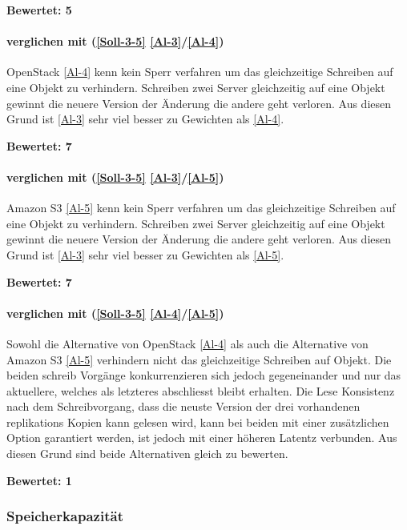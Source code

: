 \textbf{Bewertet: 5}


\paragraph*{  verglichen mit  (\ref{Soll-3-5} \ref{Al-3}/\ref{Al-4})}
OpenStack \ref{Al-4} kenn kein Sperr verfahren um das gleichzeitige Schreiben auf eine Objekt zu verhindern. Schreiben zwei Server gleichzeitig auf eine Objekt gewinnt die neuere Version der Änderung die andere geht verloren. Aus diesen Grund ist  \ref{Al-3} sehr viel besser zu Gewichten als  \ref{Al-4}.

\textbf{Bewertet: 7}

\paragraph*{  verglichen mit  (\ref{Soll-3-5} \ref{Al-3}/\ref{Al-5})}

Amazon S3 \ref{Al-5} kenn kein Sperr verfahren um das gleichzeitige Schreiben auf eine Objekt zu verhindern. Schreiben zwei Server gleichzeitig auf eine Objekt gewinnt die neuere Version der Änderung die andere geht verloren. Aus diesen Grund ist  \ref{Al-3} sehr viel besser zu Gewichten als  \ref{Al-5}.

\textbf{Bewertet: 7}

\paragraph*{  verglichen mit  (\ref{Soll-3-5} \ref{Al-4}/\ref{Al-5})}
Sowohl die Alternative von OpenStack \ref{Al-4} als auch die Alternative von Amazon S3 \ref{Al-5} verhindern nicht das gleichzeitige Schreiben auf Objekt. Die beiden schreib Vorgänge konkurrenzieren sich jedoch gegeneinander und nur das aktuellere, welches als letzteres abschliesst bleibt erhalten. Die Lese Konsistenz nach dem Schreibvorgang, dass die neuste Version der drei vorhandenen replikations Kopien kann gelesen wird, kann bei beiden mit einer zusätzlichen Option garantiert werden, ist jedoch mit einer höheren Latentz verbunden. Aus diesen Grund sind beide Alternativen gleich zu bewerten.

\textbf{Bewertet: 1}


\subsubsection{Speicherkapazität}


